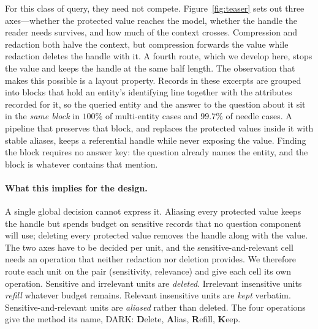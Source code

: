 For this class of query, they need not compete. Figure~\ref{fig:teaser} sets out three
axes---whether the protected value reaches the model, whether the handle the reader needs
survives, and how much of the context crosses. Compression and redaction both halve the
context, but compression forwards the value while redaction deletes the handle with it. A
fourth route, which we develop here, stops the value and keeps the handle at the same half
length.
The observation that makes this possible is a layout property. Records in these excerpts are
grouped into blocks that hold an entity's identifying
line together with the attributes recorded for it, so the queried entity and the answer to
the question about it sit in the \emph{same block} in $100\%$ of multi-entity cases and
$99.7\%$ of needle cases. A pipeline that preserves that block, and replaces the protected
values inside it with stable aliases, keeps a referential handle while never exposing the
value. Finding the block requires no answer key: the question already names the entity, and
the block is whatever contains that mention.

\paragraph{What this implies for the design.}
A single global decision cannot express it. Aliasing every protected value keeps the handle
but spends budget on sensitive records that no question component will use; deleting every
protected value removes the handle along with the value. The two axes have to be decided per
unit, and the sensitive-and-relevant cell needs an operation that neither redaction nor
deletion provides. We therefore route each unit on the pair (sensitivity, relevance) and give
each cell its own operation. Sensitive and irrelevant units are \emph{deleted}. Irrelevant
insensitive units \emph{refill} whatever budget remains. Relevant insensitive units are
\emph{kept} verbatim. Sensitive-and-relevant units are \emph{aliased} rather than deleted.
The four operations give the method its name, \textsc{DARK}: \textbf{D}elete,
\textbf{A}lias, \textbf{R}efill, \textbf{K}eep.

